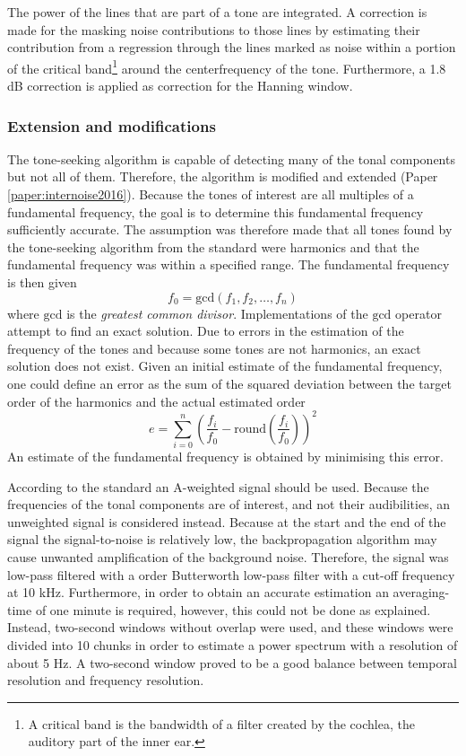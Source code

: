 The power of the lines that are part of a tone are integrated. A correction is
made for the masking noise contributions to those lines by estimating their
contribution from a regression through the lines marked as noise within a
portion of the critical band\footnote{A critical band is the bandwidth of a
filter created by the cochlea, the auditory part of the inner ear.} around the
centerfrequency of the tone. Furthermore, a 1.8 dB correction is applied as
correction for the Hanning window.

\subsubsection*{Extension and modifications}
The tone-seeking algorithm is capable of detecting many of the tonal components
but not all of them. Therefore, the algorithm is modified and extended (Paper \ref{paper:internoise2016}).
Because the tones of interest are all multiples of a
fundamental frequency, the goal is to determine this fundamental frequency
sufficiently accurate. The assumption was therefore made that all tones found by the
tone-seeking algorithm from the standard were harmonics and that the fundamental
frequency was within a specified range.
The fundamental frequency is then given
\begin{equation}
 f_{0} = \mathrm{gcd}\left(f_1, f_2, \dots, f_n \right)
\end{equation}
where $\mathrm{gcd}$ is the \emph{greatest common divisor}.
Implementations of the $\mathrm{gcd}$ operator attempt to find an exact solution.
Due to errors in the estimation of the frequency of the tones and because some tones are
not harmonics, an exact solution does not exist. Given an initial estimate of
the fundamental frequency, one could define an error as the sum of the squared
deviation between the target order of the harmonics and the actual estimated
order
\begin{equation}\label{eq:tool:features:error}
 e = \sum_{i=0}^{n} \left( \frac{f_i}{f_0} - \mathrm{round}\left(\frac{f_i}{f_0}\right) \right)^2
\end{equation}
An estimate of the fundamental frequency is obtained by minimising this error.

According to the standard an A-weighted signal should be used. Because the
frequencies of the tonal components are of interest, and not their audibilities,
an unweighted signal is considered instead. Because at the start and the end of
the signal the signal-to-noise is relatively low, the backpropagation algorithm
may cause unwanted amplification of the background noise. Therefore, the signal
was low-pass filtered with a  order Butterworth low-pass filter with a
cut-off frequency at 10 kHz. Furthermore, in order to obtain an accurate
estimation an averaging-time of one minute is required, however, this could not
be done as explained. Instead, two-second windows without overlap were used, and
these windows were divided into 10 chunks in order to estimate a power spectrum
with a resolution of about 5 Hz. A two-second window proved to be a good balance
between temporal resolution and frequency resolution.

